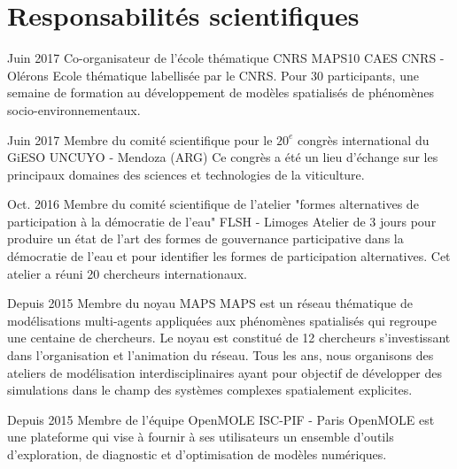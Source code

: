 \documentclass[]{cv-etienne}
\begin{document}
\section{Responsabilités scientifiques}
\begin{entrylist}
\entry
{Juin 2017}
{Co-organisateur de l'école thématique CNRS MAPS10}
{CAES CNRS - Olérons}
{Ecole thématique labellisée par le CNRS. Pour 30 participants, une semaine de formation au développement de modèles spatialisés de phénomènes socio-environnementaux.}
\end{entrylist}
\begin{entrylist}
\entry
{Juin 2017}
{Membre du comité scientifique pour le $20^{e}$ congrès international du GiESO}
{UNCUYO - Mendoza (ARG)}
{Ce congrès a été un lieu d'échange sur les principaux domaines des sciences et technologies de la viticulture.}
\end{entrylist}
\begin{entrylist}
\entry
{Oct. 2016}
{Membre du comité scientifique de l'atelier "formes alternatives de participation à la démocratie de l'eau"}
{FLSH - Limoges}
{Atelier de 3 jours pour produire un état de l'art des formes de gouvernance participative dans la démocratie de l'eau et pour identifier les formes de participation alternatives. Cet atelier a réuni 20 chercheurs internationaux.}
\end{entrylist}
\begin{entrylist}
\entry
{Depuis 2015}
{Membre du noyau MAPS}
{}
{MAPS est un réseau thématique de modélisations multi-agents appliquées aux phénomènes spatialisés qui regroupe une centaine de chercheurs. Le noyau est constitué de 12 chercheurs s'investissant dans l'organisation et l'animation du réseau. Tous les ans, nous organisons des ateliers de modélisation interdisciplinaires ayant pour objectif de développer des simulations dans le champ des systèmes complexes spatialement explicites.}
\end{entrylist}
\begin{entrylist}
\entry
{Depuis 2015}
{Membre de l'équipe OpenMOLE}
{ISC-PIF - Paris}
{OpenMOLE est une plateforme qui vise à fournir à ses utilisateurs un ensemble d'outils d'exploration, de diagnostic et d'optimisation de modèles numériques.}
\end{entrylist}
\end{document}
